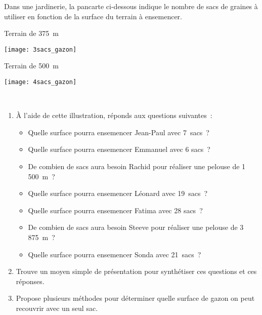 \begin{activite}

Dans une jardinerie, la pancarte ci-dessous indique le nombre de sacs de graines à utiliser en fonction de la surface du terrain à ensemencer. \\[0.5em]

\begin{minipage}[c]{0.48\linewidth}
\begin{center} Terrain de 375 m \end{center}
\vspace{0.3cm}
\begin{center} \texttt{[image: 3sacs\_gazon]} \end{center}
 \end{minipage} \hfill%
 \begin{minipage}[c]{0.48\linewidth}
\begin{center} Terrain de 500 m \end{center}
\vspace{0.3cm}
\begin{center} \texttt{[image: 4sacs\_gazon]} \end{center}
  \end{minipage} \\

\begin{enumerate}  
 \item À l’aide de cette illustration, réponds aux questions suivantes :
 \begin{itemize}
  \item Quelle surface pourra ensemencer Jean-Paul avec 7 sacs ?
  \item Quelle surface pourra ensemencer Emmanuel avec 6 sacs ?
  \item De combien de sacs aura besoin Rachid pour réaliser une pelouse de 1\,500 m ?
  \item Quelle surface pourra ensemencer Léonard avec 19 sacs ?
  \item Quelle surface pourra ensemencer Fatima avec 28 sacs ?
  \item De combien de sacs aura besoin Steeve pour réaliser une pelouse de 3\,875 m ?
  \item Quelle surface pourra ensemencer Sonda avec 21 sacs ?
  \end{itemize}
 \item Trouve un moyen simple de présentation pour synthétiser ces questions et ces réponses.
 \item Propose plusieurs méthodes pour déterminer quelle surface de gazon on peut recouvrir avec un seul sac.
\end{enumerate}

\end{activite}


